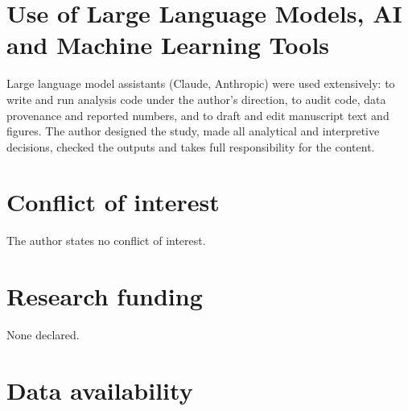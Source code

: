 \documentclass[11pt,a4paper]{article}
\begin{document}
\section*{Use of Large Language Models, AI and Machine Learning Tools}
Large language model assistants (Claude, Anthropic) were used extensively: to write and run analysis code under the author's direction, to audit code, data provenance and reported numbers, and to draft and edit manuscript text and figures. The author designed the study, made all analytical and interpretive decisions, checked the outputs and takes full responsibility for the content.

\section*{Conflict of interest}
The author states no conflict of interest.

\section*{Research funding}
None declared.

\section*{Data availability}



\end{document}
